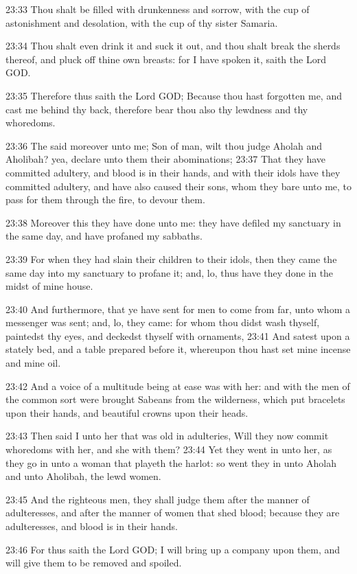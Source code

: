 23:33 Thou shalt be filled with drunkenness and sorrow, with the cup
of astonishment and desolation, with the cup of thy sister Samaria.

23:34 Thou shalt even drink it and suck it out, and thou shalt break
the sherds thereof, and pluck off thine own breasts: for I have spoken
it, saith the Lord GOD.

23:35 Therefore thus saith the Lord GOD; Because thou hast forgotten
me, and cast me behind thy back, therefore bear thou also thy lewdness
and thy whoredoms.

23:36 The \LORD said moreover unto me; Son of man, wilt thou judge
Aholah and Aholibah? yea, declare unto them their abominations; 23:37
That they have committed adultery, and blood is in their hands, and
with their idols have they committed adultery, and have also caused
their sons, whom they bare unto me, to pass for them through the fire,
to devour them.

23:38 Moreover this they have done unto me: they have defiled my
sanctuary in the same day, and have profaned my sabbaths.

23:39 For when they had slain their children to their idols, then they
came the same day into my sanctuary to profane it; and, lo, thus have
they done in the midst of mine house.

23:40 And furthermore, that ye have sent for men to come from far,
unto whom a messenger was sent; and, lo, they came: for whom thou
didst wash thyself, paintedst thy eyes, and deckedst thyself with
ornaments, 23:41 And satest upon a stately bed, and a table prepared
before it, whereupon thou hast set mine incense and mine oil.

23:42 And a voice of a multitude being at ease was with her: and with
the men of the common sort were brought Sabeans from the wilderness,
which put bracelets upon their hands, and beautiful crowns upon their
heads.

23:43 Then said I unto her that was old in adulteries, Will they now
commit whoredoms with her, and she with them?  23:44 Yet they went in
unto her, as they go in unto a woman that playeth the harlot: so went
they in unto Aholah and unto Aholibah, the lewd women.

23:45 And the righteous men, they shall judge them after the manner of
adulteresses, and after the manner of women that shed blood; because
they are adulteresses, and blood is in their hands.

23:46 For thus saith the Lord GOD; I will bring up a company upon
them, and will give them to be removed and spoiled.

